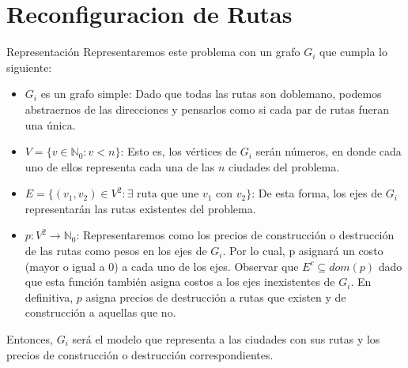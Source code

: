\documentclass[a4paper]{article}
\begin{document}
\section{Reconfiguracion de Rutas}
\begin{subsection}{Representaci\'{o}n}
Representaremos este problema con un grafo $G_i$ que cumpla lo siguiente:
\begin{itemize}
	\item{$G_i$ es un grafo simple: Dado que todas las rutas son doblemano, podemos abstraernos de las direcciones y pensarlos como si cada par de rutas fueran una \'{u}nica.}
    \item{$V = \{v \in \mathbb{N}_0 : v < n \}$: Esto es, los v\'{e}rtices de $G_i$ ser\'{a}n n\'{u}meros, en donde cada uno de ellos representa cada una de las $n$ ciudades del problema.}
    \item{$E = \{(v_1, v_2) \in V^2 : \text{$\exists$ ruta que une $v_1$ con $v_2$}  \}$: De esta forma, los ejes de $G_i$ representar\'{a}n las rutas existentes del problema.}
    \item{$p:V^2 \rightarrow \mathbb{N}_0$: Representaremos como los precios de construcci\'{o}n o destrucci\'{o}n de las rutas como pesos en los ejes de $G_i$. Por lo cual, p asignar\'{a} un costo (mayor o igual a 0) a cada uno de los ejes. Observar que $E^c \subseteq dom(p)$ dado que esta funci\'{o}n tambi\'{e}n asigna costos a los ejes inexistentes de $G_i$. En definitiva, $p$ asigna precios de destrucci\'{o}n a rutas que existen y de construcci\'{o}n a aquellas que no.}

\end{itemize}
Entonces, $G_i$ ser\'{a} el modelo que representa a las ciudades con sus rutas y los precios de construcci\'{o}n o destrucci\'{o}n correspondientes.
\end{subsection}
\end{document}
